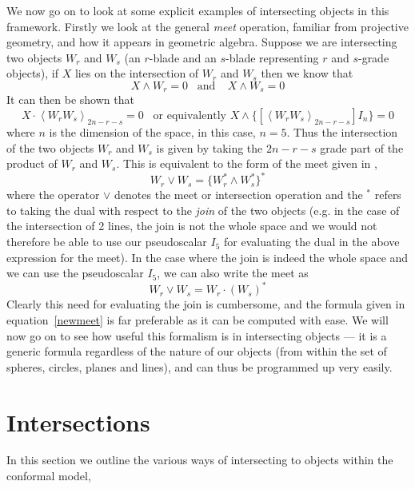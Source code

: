 We now go on to look at some explicit examples of
intersecting objects in this framework. Firstly we look
at the general \emph{meet} operation, familiar from
projective geometry, and how it appears in geometric
algebra. Suppose we are intersecting two objects $W_r$
and $W_s$ (an $r$-blade and an $s$-blade representing $r$
and $s$-grade objects), if $X$ lies on the intersection
of $W_r$ and $W_s$ then we know that
%
\[ X\wedge W_r = 0 \;\;\;\mbox{and}\;\;\;\; X\wedge W_s = 0
\]
%
It can then be shown that
%
\begin{equation}
X\cdot \left< W_r W_s \right>_{2n-r-s} = 0 \;\;\; \mbox{or equivalently }
X\wedge \{\left[\left< W_r W_s \right>_{2n-r-s}\right]I_n\} = 0
\label{newmeet}
\end{equation}
%
where $n$ is the dimension of the space, in this case, $n=5$. Thus
the intersection of the two objects $W_r$ and $W_s$ is given by
taking the $2n-r-s$ grade part of the product of $W_r$ and $W_s$.
This is equivalent to the form of the meet given in
\cite{HZ91,HS84},
%
\begin{equation}
W_r \vee W_s = \{ W_r^* \wedge W_s^*\}^*
\end{equation}
%
where the operator $\vee$ denotes the meet or
intersection operation and the $^*$ refers to taking the
dual with respect to the \emph{join} of the two objects
(e.g. in the case of the intersection of 2 lines, the
join is not the whole space and we would not therefore be
able to use our pseudoscalar $I_5$ for evaluating the
dual in the above expression for the meet). In the case
where the join is indeed the whole space and we can use
the pseudoscalar $I_5$, we can also write the meet as
%
\[W_r \vee W_s = W_r \cdot (W_s)^*  \]
%
Clearly this need for evaluating the join is cumbersome, and the
formula given in equation~\ref{newmeet} is far preferable as it
can be computed with ease. We will now go on to see how useful
this formalism is in intersecting objects --- it is a generic
formula regardless of the nature of our objects (from within the
set of spheres, circles, planes and lines), and can thus be
programmed up very easily.



\section{Intersections}

In this section we outline the various ways of intersecting to
objects within the conformal model,

